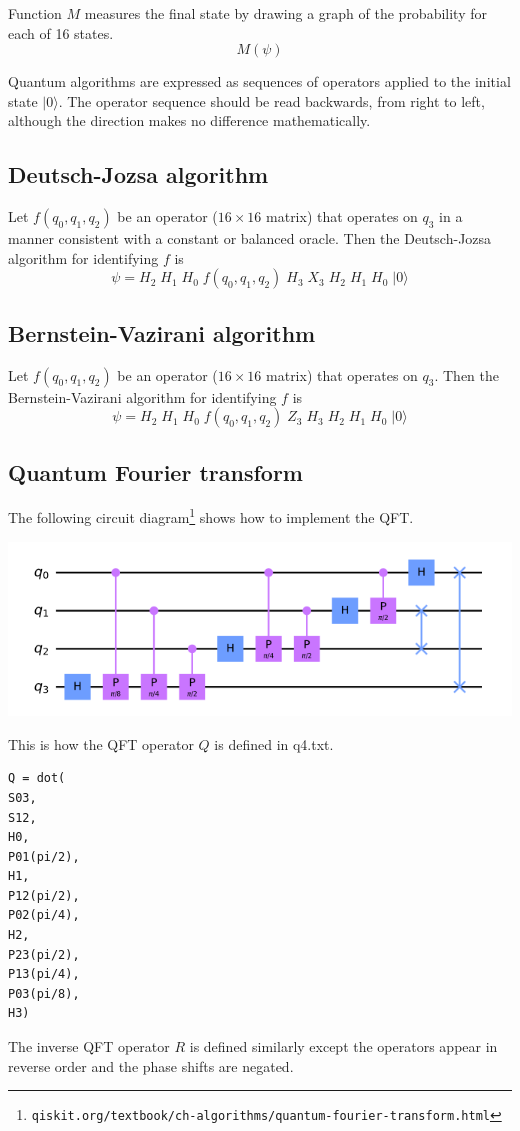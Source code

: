 \documentclass[12pt]{article}
\begin{document}
\bigskip
\noindent
Function $M$ measures the final state by drawing a graph of the probability
for each of 16 states.
\begin{equation*}
M(\psi)
\end{equation*}

\noindent
Quantum algorithms are expressed as sequences of operators applied
to the initial state $|0\rangle$.
The operator sequence should be read backwards, from right to left,
although the direction makes no difference mathematically.

\subsection*{Deutsch-Jozsa algorithm}
Let $f(q_0,q_1,q_2)$ be an operator ($16\times16$ matrix) that operates on $q_3$
in a manner consistent with a constant or balanced oracle.
Then the Deutsch-Jozsa algorithm for identifying $f$ is
\begin{equation*}
\psi = H_2 \; H_1 \; H_0 \; f(q_0,q_1,q_2) \; H_3 \; X_3 \; H_2 \; H_1 \; H_0 \; |0\rangle
\end{equation*}

\subsection*{Bernstein-Vazirani algorithm}
Let $f(q_0,q_1,q_2)$ be an operator ($16\times16$ matrix) that operates on $q_3$.
Then the Bernstein-Vazirani algorithm for identifying $f$ is
\begin{equation*}
\psi = H_2 \; H_1 \; H_0 \; f(q_0,q_1,q_2) \; Z_3 \; H_3 \; H_2 \; H_1 \; H_0 \; |0\rangle
\end{equation*}

\subsection*{Quantum Fourier transform}
The following circuit diagram\footnote{\tt qiskit.org/textbook/ch-algorithms/quantum-fourier-transform.html}
shows how to implement the QFT.

\begin{center}
\includegraphics[scale=0.5]{qft.png}
\end{center}

\noindent
This is how the QFT operator $Q$ is defined in q4.txt.

\begin{Verbatim}
Q = dot(
S03,
S12,
H0,
P01(pi/2),
H1,
P12(pi/2),
P02(pi/4),
H2,
P23(pi/2),
P13(pi/4),
P03(pi/8),
H3)
\end{Verbatim}

\noindent
The inverse QFT operator $R$ is defined similarly except the operators appear in reverse order
and the phase shifts are negated.
\end{document}
